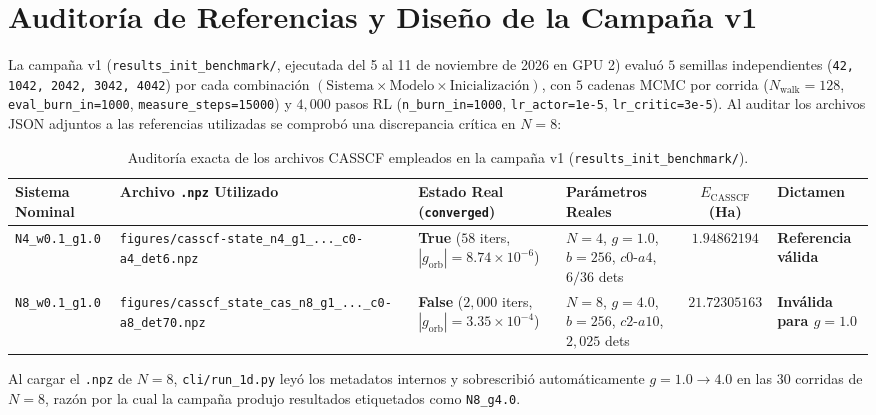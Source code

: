 \documentclass[10pt,a4paper]{article}
\begin{document}
\section{Auditor\'ia de Referencias y Dise\~no de la Campa\~na v1}

La campa\~na v1 (\texttt{results\_init\_benchmark/}, ejecutada del 5 al 11 de noviembre de 2026 en GPU 2) evalu\'o $5$ semillas independientes (\texttt{42, 1042, 2042, 3042, 4042}) por cada combinaci\'on $(\text{Sistema}\times \text{Modelo}\times \text{Inicializaci\'on})$, con $5$ cadenas MCMC por corrida ($N_{\mathrm{walk}}=128$, \texttt{eval\_burn\_in=1000}, \texttt{measure\_steps=15000}) y $4{,}000$ pasos RL (\texttt{n\_burn\_in=1000}, \texttt{lr\_actor=1e-5}, \texttt{lr\_critic=3e-5}). Al auditar los archivos JSON adjuntos a las referencias utilizadas se comprob\'o una discrepancia cr\'itica en $N=8$:

\begin{table}[H]
\centering
\caption{Auditor\'ia exacta de los archivos CASSCF empleados en la campa\~na v1 (\texttt{results\_init\_benchmark/}).}
\begin{adjustbox}{max width=\textwidth}
\begin{tabular}{llllcl}
\toprule
\textbf{Sistema Nominal} & \textbf{Archivo \texttt{.npz} Utilizado} & \textbf{Estado Real (\texttt{converged})} & \textbf{Par\'ametros Reales} & \textbf{$E_{\mathrm{CASSCF}}$ (Ha)} & \textbf{Dictamen} \\
\midrule
\texttt{N4\_w0.1\_g1.0} & \texttt{figures/casscf-state\_n4\_g1\_...\_c0-a4\_det6.npz} & \textbf{True} ($58$ iters, $|g_{\mathrm{orb}}|=8.74\times 10^{-6}$) & $N=4$, $g=1.0$, $b=256$, $c0\text{-}a4$, $6/36$ dets & $1.94862194$ & \textbf{Referencia v\'alida} \\
\texttt{N8\_w0.1\_g1.0} & \texttt{figures/casscf\_state\_cas\_n8\_g1\_...\_c0-a8\_det70.npz} & \textbf{False} ($2{,}000$ iters, $|g_{\mathrm{orb}}|=3.35\times 10^{-4}$) & $N=8$, \textbf{$g=4.0$}, $b=256$, \textbf{$c2\text{-}a10$}, $2{,}025$ dets & $21.72305163$ & \textbf{Inv\'alida para $g=1.0$} \\
\bottomrule
\end{tabular}
\end{adjustbox}
\end{table}

Al cargar el \texttt{.npz} de $N=8$, \texttt{cli/run\_1d.py} ley\'o los metadatos internos y sobrescribi\'o autom\'aticamente $g=1.0 \to 4.0$ en las $30$ corridas de $N=8$, raz\'on por la cual la campa\~na produjo resultados etiquetados como \texttt{N8\_g4.0}.
\end{document}
